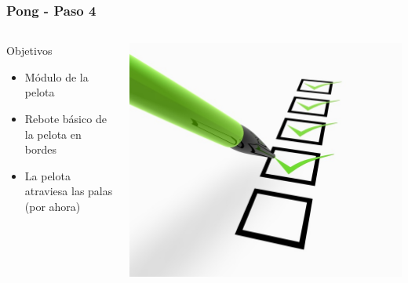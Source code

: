 \begin{frame}
	\frametitle{Pong - Paso 4}
    \begin{columns}[c]
	\column{175pt}
	\begin{block}{Objetivos}
		\begin{itemize}
			\item Módulo de la pelota
			\item Rebote básico de la pelota en bordes
			\item La pelota atraviesa las palas (por ahora)
		\end{itemize}            
	\end{block}
    \column{125pt}
	\begin{center}
		\includegraphics[scale=0.6]{img/checklist.jpg}
	\end{center}	
	
    \end{columns}
\end{frame}


